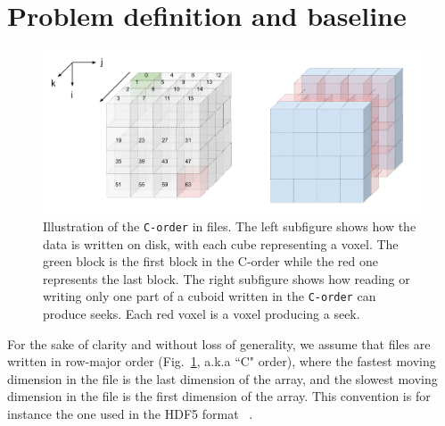 \documentclass[sigconf, nonacm]{acmart}
\begin{document}



\section{Problem definition and baseline}
\begin{figure}[h]
  \centering
  \includegraphics[scale=0.35]{./figures/new/figure_1.png}
  \caption{Illustration of the \texttt{C-order} in files. The left subfigure
  shows how the data is written on disk, with each cube representing a voxel.
  The green block is the first block in the C-order while the red one represents the last block.
  The right subfigure shows how reading or writing only one part of a cuboid written
  in the \texttt{C-order} can produce seeks. Each red voxel is a voxel producing a seek.}
  \label{fig:seeks_and_rowmajor}
\end{figure}

For the sake of clarity and without loss of generality, we assume that
 files are written in row-major order (Fig.~\ref{fig:seeks_and_rowmajor},
 a.k.a ``C" order), where the fastest moving dimension in the file is the
 last dimension of the array, and the slowest moving dimension in the file
 is the first dimension of the array. This convention is for instance the
 one used in the HDF5 format ~\cite{hdf5}. 
\end{document}
